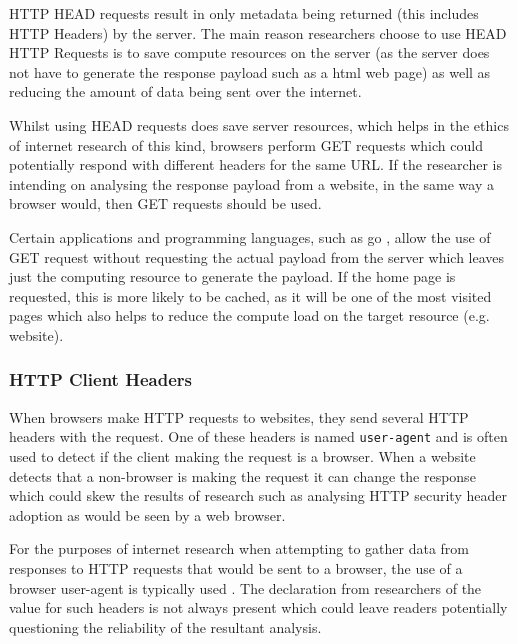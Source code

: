 \documentclass{mscreport}
\begin{document}
\vspace{0.3cm} \noindent
HTTP HEAD requests result in only metadata being returned (this includes HTTP Headers) by the server. The main reason researchers choose to use HEAD HTTP Requests \cite{Amann2017-co} is to save compute resources on the server (as the server does not have to generate the response payload such as a html web page) as well as reducing the amount of data being sent over the internet.

\vspace{0.3cm} \noindent
Whilst using HEAD requests does save server resources, which helps in the ethics of internet research of this kind, browsers perform GET requests which could potentially respond with different headers for the same URL. If the researcher is intending on analysing the response payload from a website, in the same way a browser would, then GET requests \cite{Chen2016-dl,Kumar2017-qw} should be used.

\vspace{0.3cm} \noindent
Certain applications and programming languages, such as go \cite{noauthor_undated-lc}, allow the use of GET request without requesting the actual payload from the server which leaves just the computing resource to generate the payload. If the home page is requested, this is more likely to be cached, as it will be one of the most visited pages which also helps to reduce the compute load on the target resource (e.g. website).

\subsubsection{HTTP Client Headers}

When browsers make HTTP requests to websites, they send several HTTP headers with the request. One of these headers is named \texttt{user-agent} and is often used to detect if the client making the request is a browser. When a website detects that a non-browser is making the request it can change the response which could skew the results of research such as analysing HTTP security header adoption as would be seen by a web browser.

\vspace{0.3cm} \noindent
For the purposes of internet research when attempting to gather data from responses to HTTP requests that would be sent to a browser, the use of a browser user-agent is typically used \cite{Buchanan2018-xz, Patil2017-bg,Ying2016-ag,Lavrenovs2018-dl,Poteat2021-zr}. The declaration from researchers of the value for such headers is not always present \cite{Amann2017-co} which could leave readers potentially questioning the reliability of the resultant analysis.
\end{document}
